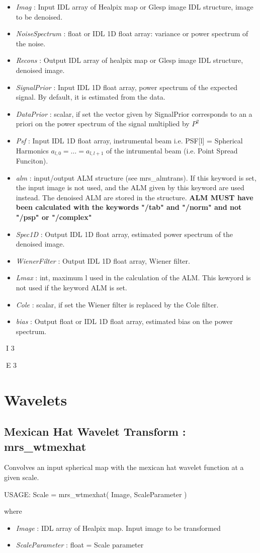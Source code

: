 \begin{itemize}
\item {\em Imag} : Input IDL array of Healpix map or Glesp image IDL structure, image to be denoised.
\item {\em NoiseSpectrum} : float or IDL 1D float array: variance or power spectrum of the noise.
\item {\em Recons} : Output IDL array of healpix map or Glesp image IDL structure, denoised image.
\item {\em SignalPrior} : Input IDL 1D float array, power spectrum of the expected signal. By default, it is estimated from the data.
\item {\em DataPrior} : scalar, if set the vector given by SignalPrior corresponds to an a priori on the power spectrum of the signal multiplied by $P^2$
\item {\em Psf} : Input IDL 1D float array, instrumental beam i.e. PSF[l] = Spherical Harmonics $a_{l,0} = \ldots = a_{l,l+1}$ of the intrumental beam (i.e. Point Spread Funciton).
\item {\em alm} : input/output ALM structure (see mrs\_almtrans). If this keyword is set, the input image 
is not used, and the ALM given by this keyword are used instead. The denoised ALM are stored in the structure.
{\bf ALM MUST have been calculated with the keywords "/tab" and "/norm" and not "/psp" or "/complex"} 
\item {\em Spec1D} : Output IDL 1D float array, estimated power spectrum of the denoised image.
\item {\em WienerFilter} : Output IDL 1D float array, Wiener filter.
\item {\em Lmax} : int, maximum l used in the calculation of the ALM. This kewyord is not used if the keyword ALM is set.
\item {\em Cole} : scalar, if set the Wiener filter is replaced by the Cole filter.
\item {\em bias} : Output float or IDL 1D float array, estimated bias on the power spectrum.
\end{itemize}



I 3

E 3
\section{Wavelets}

\subsection{Mexican Hat Wavelet Transform : mrs\_wtmexhat}
Convolves an input spherical map with the mexican hat wavelet function at a given scale.
{\bf
\begin{center}
     USAGE: Scale = mrs\_wtmexhat( Image, ScaleParameter )   
\end{center}}
where 
\begin{itemize}
\item {\em Image} : IDL array of Healpix map. Input image to be transformed 
\item {\em ScaleParameter} : float = Scale parameter  
\end{itemize}
